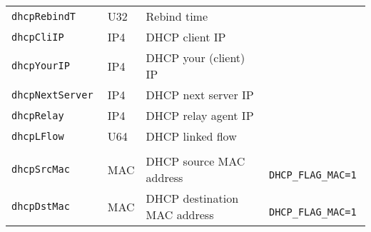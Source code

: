 \documentclass[documentation]{subfiles}
\begin{document}
\begin{longtable}{>{\tt}lll>{\tt\small}l}
    dhcpRebindT                       & U32           & Rebind time                               & \\
    dhcpCliIP                         & IP4           & DHCP client IP                            & \\
    dhcpYourIP                        & IP4           & DHCP your (client) IP                     & \\
    dhcpNextServer                    & IP4           & DHCP next server IP                       & \\
    dhcpRelay                         & IP4           & DHCP relay agent IP                       & \\
    dhcpLFlow                         & U64           & DHCP linked flow                          & \\
    \\
    dhcpSrcMac                        & MAC           & DHCP source MAC address                   & DHCP\_FLAG\_MAC=1\\
    dhcpDstMac                        & MAC           & DHCP destination MAC address              & DHCP\_FLAG\_MAC=1\\
    \bottomrule
\end{longtable}
\end{document}
